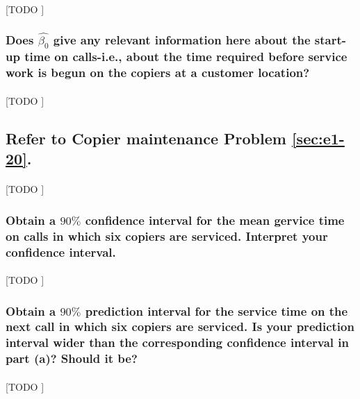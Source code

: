 \documentclass{article}
\begin{document}
        \paragraph{}
        [TODO ]

      \subsubsection{Does $\widehat{\beta_0}$ give any relevant information here about the start-up time on calls-i.e., about the time required before service work is begun on the copiers at a customer location?}

        \paragraph{}
        [TODO ]

    \setcounter{subsection}{13}
    \subsection{Refer to \textbf{Copier maintenance} Problem \ref{sec:e1-20}.}

      \paragraph{}
      [TODO ]

      \subsubsection{Obtain a $90\%$ confidence interval for the mean gervice time on calls in which six copiers are serviced. Interpret your confidence interval.}

        \paragraph{}
        [TODO ]

      \subsubsection{Obtain a $90\%$ prediction interval for the service time on the next call in which six copiers are serviced. Is your prediction interval wider than the corresponding confidence interval in part (a)? Should it be?}

        \paragraph{}
        [TODO ]
\end{document}
